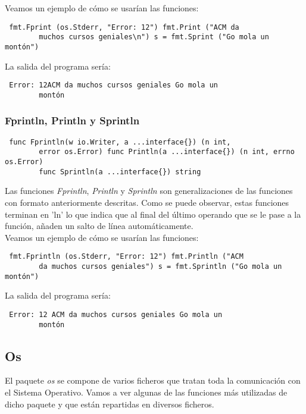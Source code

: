 		Veamos un ejemplo de cómo se usarían las funciones:
		
		\begin{verbatim} fmt.Fprint (os.Stderr, "Error: 12") fmt.Print ("ACM da
		muchos cursos geniales\n") s = fmt.Sprint ("Go mola un montón")
		\end{verbatim}
		
		La salida del programa sería:
		
		\begin{verbatim} Error: 12ACM da muchos cursos geniales Go mola un
		montón \end{verbatim}
		
		\subsubsection{Fprintln, Println y Sprintln}
		
		\begin{verbatim} func Fprintln(w io.Writer, a ...interface{}) (n int,
		error os.Error) func Println(a ...interface{}) (n int, errno os.Error)
		func Sprintln(a ...interface{}) string \end{verbatim}
		
		Las funciones \textit{Fprintln}, \textit{Println} y \textit{Sprintln}
		son generalizaciones de las funciones con formato anteriormente
		descritas. Como se puede observar, estas funciones terminan en 'ln' lo
		que indica que al final del último operando que se le pase a la función,
		añaden un salto de línea automáticamente.\\
				
		Veamos un ejemplo de cómo se usarían las funciones:
		
		\begin{verbatim} fmt.Fprintln (os.Stderr, "Error: 12") fmt.Println ("ACM
		da muchos cursos geniales") s = fmt.Sprintln ("Go mola un montón")
		\end{verbatim}
		
		La salida del programa sería:
		
		\begin{verbatim} Error: 12 ACM da muchos cursos geniales Go mola un
		montón \end{verbatim}

	\subsection{Os}
	
	El paquete \textit{os} se compone de varios ficheros que tratan toda la
	comunicación con el Sistema Operativo. Vamos a ver algunas de las funciones
	más utilizadas de dicho paquete y que están repartidas en diversos ficheros.
	
